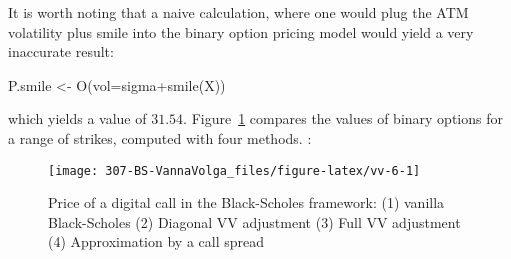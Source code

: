 \documentclass[]{tufte-book}
\newenvironment{Shaded}{}{}
\newcommand{\AttributeTok}[1]{\textcolor[rgb]{0.49,0.56,0.16}{#1}}
\newcommand{\FunctionTok}[1]{\textcolor[rgb]{0.02,0.16,0.49}{#1}}
\newcommand{\NormalTok}[1]{#1}
\newcommand{\OtherTok}[1]{\textcolor[rgb]{0.00,0.44,0.13}{#1}}
\newcommand{\SpecialCharTok}[1]{\textcolor[rgb]{0.25,0.44,0.63}{#1}}
\begin{document}
It is worth noting that a naive calculation, where one would plug the
ATM volatility plus smile into the binary option pricing model would
yield a very inaccurate result:

\begin{Shaded}
\begin{Highlighting}[]
\NormalTok{  P.smile }\OtherTok{\textless{}{-}} \FunctionTok{O}\NormalTok{(}\AttributeTok{vol=}\NormalTok{sigma}\SpecialCharTok{+}\FunctionTok{smile}\NormalTok{(X))}
\end{Highlighting}
\end{Shaded}

which yields a value of \(31.54\). Figure~\ref{fig:vv-6}
compares the values of binary options for a range of strikes, computed
with four methods. :

\begin{figure}
\texttt{[image: 307-BS-VannaVolga\_files/figure-latex/vv-6-1]} \caption[Price of a digital call in the Black-Scholes framework]{Price of a digital call in the Black-Scholes framework: (1) vanilla Black-Scholes (2) Diagonal VV adjustment (3) Full VV adjustment (4)  Approximation by a call spread}\label{fig:vv-6}
\end{figure}


\printindex
\end{document}
